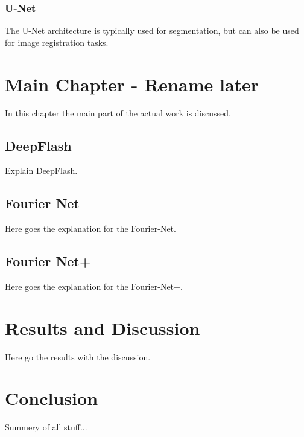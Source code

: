 \documentclass[english,version-2020-11]{uzl-thesis}
\begin{document}
\subsection{U-Net}
The U-Net architecture is typically used for segmentation, but can also be used for image registration tasks.





\chapter{Main Chapter - Rename later}
In this chapter the main part of the actual work is discussed.

\section{DeepFlash}
Explain DeepFlash.

\section{Fourier Net}
Here goes the explanation for the Fourier-Net.

\section{Fourier Net+}
Here goes the explanation for the Fourier-Net+.




\chapter{Results and Discussion}
Here go the results with the discussion.





\chapter{Conclusion}
Summery of all stuff...
\end{document}
